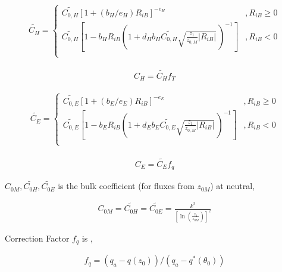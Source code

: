 \begin{eqnarray}
    \widetilde{C_H} = \left\{
      \begin{array}{lr}
      \widetilde{C_{0,H}} [ 1 + (b_H/e_H) R_{iB} ]^{-e_H}
            &,
          R_{iB} \geq 0 \\
      \widetilde{C_{0,H}} \left[ 1 - b_H R_{iB}
                                  \left( 1+ d_H b_H \widetilde{C_{0,H}}
                                  \sqrt{\frac{z_1}{z_{0,M}}| R_{iB}|} \,
                                  \right)^{-1} \right]
             &,     
          R_{iB} < 0 \\
      \end{array} \right.
\end{eqnarray}

\begin{eqnarray}
    C_H = \widetilde{C_H} f_T
\end{eqnarray}

\begin{eqnarray}
    \widetilde{C_E} = \left\{
      \begin{array}{lr}
      \widetilde{C_{0,E}} [ 1 + (b_E/e_E) R_{iB} ]^{-e_E}
            &,
          R_{iB} \geq 0 \\
      \widetilde{C_{0,E}} \left[ 1 - b_E R_{iB}
                                  \left( 1+ d_E b_E \widetilde{C_{0,E}}
                                  \sqrt{\frac{z_1}{z_{0,M}}| R_{iB}|} \,
                                  \right)^{-1} \right]      
          &,
          R_{iB} < 0 \\
      \end{array} \right.
\end{eqnarray}

\begin{eqnarray}
    C_E = \widetilde{C_E} f_q
\end{eqnarray}

\(C_{0M}, \widetilde{C_{0H}}, \widetilde{C_{0E}}\) is the bulk
coefficient (for fluxes from \(z_{0M}\)) at neutral,

\begin{eqnarray}
    C_{0M}  =  \widetilde{C_{0H}}  =  \widetilde{C_{0E}}  =
       \frac{k^2}{\left[\ln \left(\frac{z_1}{z_{0M}}\right)\right]^2 }
\end{eqnarray}

Correction Factor \(f_q\) is ,

\begin{eqnarray}
  f_q = (q_a - q(z_0))/(q_a - q^{\ast}(\theta_0))
\end{eqnarray}

